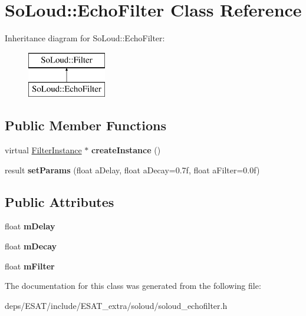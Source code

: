 \hypertarget{class_so_loud_1_1_echo_filter}{}\section{So\+Loud\+:\+:Echo\+Filter Class Reference}
\label{class_so_loud_1_1_echo_filter}
Inheritance diagram for So\+Loud\+:\+:Echo\+Filter\+:\begin{figure}[H]
\begin{center}
\leavevmode
\includegraphics[height=2.000000cm]{class_so_loud_1_1_echo_filter}
\end{center}
\end{figure}
\subsection*{Public Member Functions}
\begin{DoxyCompactItemize}
\item 
\mbox{\label{class_so_loud_1_1_echo_filter_a52bef9ece5674bbf2c8391fd8ef03d06}} 
virtual \mbox{\hyperlink{class_so_loud_1_1_filter_instance}{Filter\+Instance}} $\ast$ {\bfseries create\+Instance} ()
\item 
\mbox{\label{class_so_loud_1_1_echo_filter_adf9a75c94ca8451d7ab599e4cd9387bd}} 
result {\bfseries set\+Params} (float a\+Delay, float a\+Decay=0.\+7f, float a\+Filter=0.\+0f)
\end{DoxyCompactItemize}
\subsection*{Public Attributes}
\begin{DoxyCompactItemize}
\item 
\mbox{\label{class_so_loud_1_1_echo_filter_a14a5bdf6c0bb264dc4fb517961fc8e13}} 
float {\bfseries m\+Delay}
\item 
\mbox{\label{class_so_loud_1_1_echo_filter_a1e11873461a6393defa8ed04cea81a69}} 
float {\bfseries m\+Decay}
\item 
\mbox{\label{class_so_loud_1_1_echo_filter_ab7fa97fec38e74941837b6ed0853e3c3}} 
float {\bfseries m\+Filter}
\end{DoxyCompactItemize}


The documentation for this class was generated from the following file\+:\begin{DoxyCompactItemize}
\item 
deps/\+E\+S\+A\+T/include/\+E\+S\+A\+T\+\_\+extra/soloud/soloud\+\_\+echofilter.\+h\end{DoxyCompactItemize}
